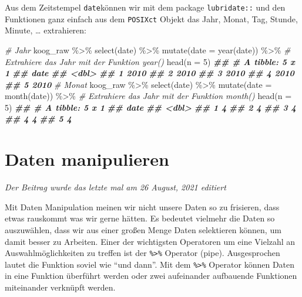 \documentclass[
]{article}
\newenvironment{Shaded}{\begin{snugshade}}{\end{snugshade}}
\newcommand{\AttributeTok}[1]{\textcolor[rgb]{0.77,0.63,0.00}{#1}}
\newcommand{\CommentTok}[1]{\textcolor[rgb]{0.56,0.35,0.01}{\textit{#1}}}
\newcommand{\DecValTok}[1]{\textcolor[rgb]{0.00,0.00,0.81}{#1}}
\newcommand{\DocumentationTok}[1]{\textcolor[rgb]{0.56,0.35,0.01}{\textbf{\textit{#1}}}}
\newcommand{\FunctionTok}[1]{\textcolor[rgb]{0.00,0.00,0.00}{#1}}
\newcommand{\NormalTok}[1]{#1}
\newcommand{\SpecialCharTok}[1]{\textcolor[rgb]{0.00,0.00,0.00}{#1}}
\begin{document}
Aus dem Zeitstempel \texttt{date}können wir mit dem package \texttt{lubridate::} und den Funktionen ganz einfach aus dem \texttt{POSIXct} Objekt das Jahr, Monat, Tag, Stunde, Minute, \ldots{} extrahieren:

\begin{Shaded}
\begin{Highlighting}[]
\CommentTok{\# Jahr}
\NormalTok{koog\_raw }\SpecialCharTok{\%\textgreater{}\%}
  \FunctionTok{select}\NormalTok{(date) }\SpecialCharTok{\%\textgreater{}\%}
  \FunctionTok{mutate}\NormalTok{(}\AttributeTok{date =} \FunctionTok{year}\NormalTok{(date)) }\SpecialCharTok{\%\textgreater{}\%} \CommentTok{\# Extrahiere das Jahr mit der Funktion \textasciigrave{}year()\textasciigrave{}}
  \FunctionTok{head}\NormalTok{(}\AttributeTok{n =} \DecValTok{5}\NormalTok{)}
\DocumentationTok{\#\# \# A tibble: 5 x 1}
\DocumentationTok{\#\#    date}
\DocumentationTok{\#\#   \textless{}dbl\textgreater{}}
\DocumentationTok{\#\# 1  2010}
\DocumentationTok{\#\# 2  2010}
\DocumentationTok{\#\# 3  2010}
\DocumentationTok{\#\# 4  2010}
\DocumentationTok{\#\# 5  2010}
\CommentTok{\# Monat}
\NormalTok{koog\_raw }\SpecialCharTok{\%\textgreater{}\%}
  \FunctionTok{select}\NormalTok{(date) }\SpecialCharTok{\%\textgreater{}\%}
  \FunctionTok{mutate}\NormalTok{(}\AttributeTok{date =} \FunctionTok{month}\NormalTok{(date)) }\SpecialCharTok{\%\textgreater{}\%} \CommentTok{\# Extrahiere das Jahr mit der Funktion \textasciigrave{}month()\textasciigrave{}}
  \FunctionTok{head}\NormalTok{(}\AttributeTok{n =} \DecValTok{5}\NormalTok{)}
\DocumentationTok{\#\# \# A tibble: 5 x 1}
\DocumentationTok{\#\#    date}
\DocumentationTok{\#\#   \textless{}dbl\textgreater{}}
\DocumentationTok{\#\# 1     4}
\DocumentationTok{\#\# 2     4}
\DocumentationTok{\#\# 3     4}
\DocumentationTok{\#\# 4     4}
\DocumentationTok{\#\# 5     4}
\end{Highlighting}
\end{Shaded}

\hypertarget{daten-manipulieren}{%
\section{Daten manipulieren}\label{daten-manipulieren}}

\emph{Der Beitrag wurde das letzte mal am 26 August, 2021 editiert}

Mit Daten Manipulation meinen wir nicht unsere Daten so zu frisieren, dass etwas rauskommt was wir gerne hätten. Es bedeutet vielmehr die Daten so auszuwählen, dass wir aus einer großen Menge Daten selektieren können, um damit besser zu Arbeiten. Einer der wichtigsten Operatoren um eine Vielzahl an Auswahlmöglichkeiten zu treffen ist der \texttt{\%\textgreater{}\%} Operator (pipe). Ausgesprochen lautet die Funktion soviel wie ``und dann''. Mit dem \texttt{\%\textgreater{}\%} Operator können Daten in eine Funktion überführt werden oder zwei aufeinander aufbauende Funktionen miteinander verknüpft werden.
\end{document}
